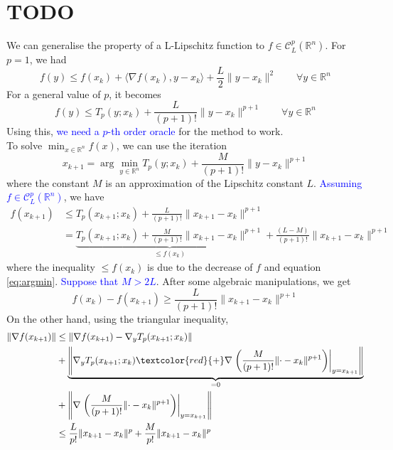 \documentclass[12pt, openany]{report}
\newcommand{\R}{\mathbb{R}}
\newcommand{\C}{\mathcal{C}}
\theoremstyle{definition}
\begin{document}
\chapter{TODO}\label{chap:right_oracle}
We can generalise the property of a L-Lipschitz function to $f\in \C_L^p(\R^n)$. For $p=1$, we had 
\begin{equation}
	f(y)\le f(x_k) + \langle \nabla f(x_k),y-x_k\rangle + \frac{L}{2}\lVert y-x_k\rVert^2 \qquad \forall y\in \R^n 
\end{equation}
For a general value of $p$, it becomes 
\begin{equation}
	f(y) \le T_p(y;x_k) + \frac{L}{(p+1)!}\lVert y-x_k\rVert^{p+1} \qquad \forall y\in \R^n 
\end{equation}
Using this, \textcolor{blue}{we need a $p$-th order oracle} for the method to work. \\
To solve $\min_{x\in \R^n} f(x)$, we can use the iteration 
\begin{equation}\label{eq:argmin}
	x_{k+1} = \arg\min_{y\in \R^n} T_p(y;x_k)+\frac{M}{(p+1)!}\lVert y-x_k\rVert^{p+1}
\end{equation}
where the constant $M$ is an approximation of the Lipschitz constant $L$. \textcolor{blue}{Assuming $f\in \C^p_L(\R^n)$}, we have 
\begin{equation}
	\begin{aligned}
		f(x_{k+1}) &\le T_p(x_{k+1};x_k) + \frac{L}{(p+1)!}\lVert x_{k+1}-x_k\rVert^{p+1}\\
		&= \underbrace{T_p(x_{k+1};x_k) + \frac{M}{(p+1)!}\lVert x_{k+1}-x_k\rVert^{p+1}}_{\le f(x_k)} + \frac{(L-M)}{(p+1)!}\lVert x_{k+1}-x_k\rVert^{p+1}
	\end{aligned}
\end{equation}
where the inequality $\le f(x_k)$ is due to the decrease of $f$ and equation \eqref{eq:argmin}. 
\textcolor{blue}{Suppose that $M>2L$}. After some algebraic manipulations, we get
\begin{equation}\label{eq:bound}
	f(x_k)-f(x_{k+1}) \ge \frac{L}{(p+1)!}\lVert x_{k+1}-x_k\rVert^{p+1}
\end{equation}
On the other hand, using the triangular inequality, 
\begin{equation}
	\begin{aligned}
		\lVert \nabla f(x_{k+1})\rVert & \le \lVert \nabla f(x_{k+1})-\nabla_y T_p(x_{k+1};x_k)\lVert\\
		& + \underbrace{\left \lVert \nabla_y T_p(x_{k+1};x_k)\textcolor{red}{+}\nabla \left.\left(\frac{M}{(p+1)!} \lVert \cdot -x_k\rVert^{p+1}\right)\right|_{y=x_{k+1}}\right \rVert}_{=0}	\\
		& + \left\lVert \nabla \left.\left(\frac{M}{(p+1)!}\lVert \cdot -x_k\rVert^{p+1}\right)\right|_{y=x_{k+1}}\right \rVert \\
		& \le \frac{L}{p!}\lVert x_{k+1}-x_k\rVert^p + \frac{M}{p!} \lVert x_{k+1}-x_k\rVert^p
	\end{aligned}
\end{equation}
\end{document}

